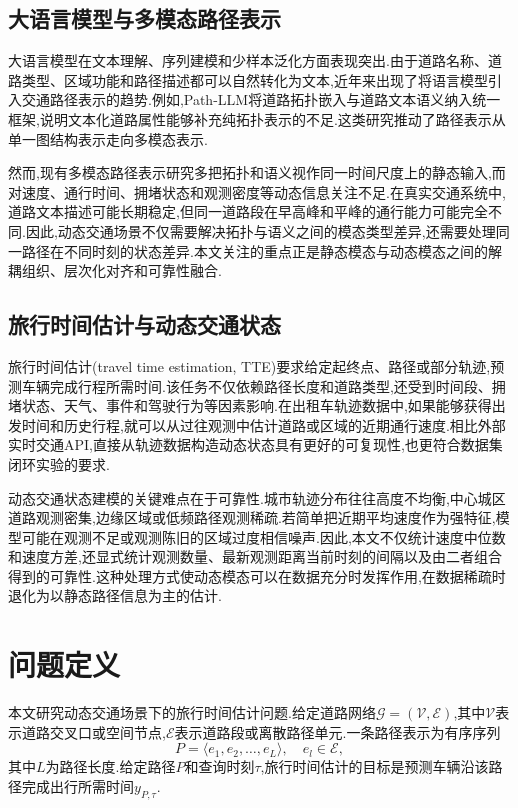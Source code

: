 \documentclass{rjthesis}
\begin{document}
\subsection{大语言模型与多模态路径表示}

大语言模型在文本理解、序列建模和少样本泛化方面表现突出\cite{brown2020language,devlin2019bert}.由于道路名称、道路类型、区域功能和路径描述都可以自然转化为文本,近年来出现了将语言模型引入交通路径表示的趋势.例如,Path-LLM\cite{wei2025pathllm}将道路拓扑嵌入与道路文本语义纳入统一框架,说明文本化道路属性能够补充纯拓扑表示的不足.这类研究推动了路径表示从单一图结构表示走向多模态表示.

然而,现有多模态路径表示研究多把拓扑和语义视作同一时间尺度上的静态输入,而对速度、通行时间、拥堵状态和观测密度等动态信息关注不足.在真实交通系统中,道路文本描述可能长期稳定,但同一道路段在早高峰和平峰的通行能力可能完全不同.因此,动态交通场景不仅需要解决拓扑与语义之间的模态类型差异,还需要处理同一路径在不同时刻的状态差异.本文关注的重点正是静态模态与动态模态之间的解耦组织、层次化对齐和可靠性融合.

\subsection{旅行时间估计与动态交通状态}

旅行时间估计(travel time estimation, TTE)要求给定起终点、路径或部分轨迹,预测车辆完成行程所需时间.该任务不仅依赖路径长度和道路类型,还受到时间段、拥堵状态、天气、事件和驾驶行为等因素影响.在出租车轨迹数据中,如果能够获得出发时间和历史行程,就可以从过往观测中估计道路或区域的近期通行速度.相比外部实时交通API,直接从轨迹数据构造动态状态具有更好的可复现性,也更符合数据集闭环实验的要求.

动态交通状态建模的关键难点在于可靠性.城市轨迹分布往往高度不均衡,中心城区道路观测密集,边缘区域或低频路径观测稀疏.若简单把近期平均速度作为强特征,模型可能在观测不足或观测陈旧的区域过度相信噪声.因此,本文不仅统计速度中位数和速度方差,还显式统计观测数量、最新观测距离当前时刻的间隔以及由二者组合得到的可靠性.这种处理方式使动态模态可以在数据充分时发挥作用,在数据稀疏时退化为以静态路径信息为主的估计.

\section{问题定义}

本文研究动态交通场景下的旅行时间估计问题.给定道路网络$\mathcal{G}=(\mathcal{V},\mathcal{E})$,其中$\mathcal{V}$表示道路交叉口或空间节点,$\mathcal{E}$表示道路段或离散路径单元.一条路径表示为有序序列
\begin{equation}
	P=\langle e_1,e_2,\ldots,e_L\rangle,\quad e_l\in\mathcal{E},
\end{equation}
其中$L$为路径长度.给定路径$P$和查询时刻$\tau$,旅行时间估计的目标是预测车辆沿该路径完成出行所需时间$y_{P,\tau}$.
\end{document}
